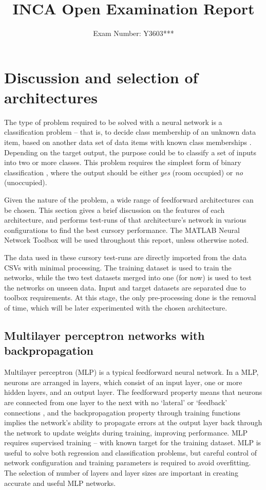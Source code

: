 \documentclass[10pt, oneside]{article}
\title{\vspace{-1.6cm}INCA Open Examination Report}
\author{Exam Number: Y3603***}
\date{}
\begin{document}
\maketitle
\section{Discussion and selection of architectures} \label{sec:architectures}
The type of problem required to be solved with a neural network is a classification problem -- that is, to decide class membership of an unknown data item, based on another data set of data items with known class memberships \cite[Sec. 2]{Dreiseitl2002352}. Depending on the target output, the purpose could be to classify a set of inputs into two or more classes. This problem requires the simplest form of binary classification \cite[Fig. 4]{candanedo2016accurate}, where the output should be either \textit{yes} (room occupied) or \textit{no} (unoccupied). 

Given the nature of the problem, a wide range of feedforward architectures can be chosen. This section gives a brief discussion on the features of each architecture, and performs test-runs of that architecture's network in various configurations to find the best cursory performance. The MATLAB Neural Network Toolbox \cite{kohonen2014matlab} will be used throughout this report, unless otherwise noted.

The data used in these cursory test-runs are directly imported from the data CSVs with minimal processing. The training dataset is used to train the networks, while the two test datasets merged into one (for now) is used to test the networks on unseen data. Input and target datasets are separated due to toolbox requirements. At this stage, the only pre-processing done is the removal of time, which will be later experimented with the chosen architecture.

\subsection{Multilayer perceptron networks with backpropagation}

Multilayer perceptron (MLP) is a typical feedforward neural network. In a MLP, neurons are arranged in layers, which consist of an input layer, one or more hidden layers, and an output layer. The feedforward property means that neurons are connected from one layer to the next with no `lateral' or `feedback' connections \cite{som-lecture}, and the backpropagation property through training functions implies the network's ability to propagate errors at the output layer back through the network to update weights during training, improving performance. MLP requires supervised training -- with known target for the training dataset. MLP is useful to solve both regression and classification problems, but careful control of network configuration and training parameters is required to avoid overfitting. The selection of number of layers and layer sizes are important in creating accurate and useful MLP networks.
\end{document}
